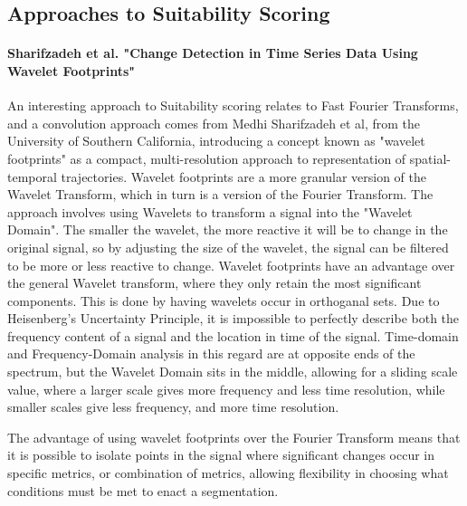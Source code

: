 \documentclass[12pt,a4paper]{report}
\begin{document}
\subsection{Approaches to Suitability Scoring}

\paragraph{Sharifzadeh et al. "Change Detection in Time Series Data Using Wavelet Footprints"}
An interesting approach to Suitability scoring relates to Fast Fourier Transforms, and a convolution approach comes from Medhi Sharifzadeh et al, from the University of Southern California, introducing a concept known as
"wavelet footprints" as a compact, multi-resolution approach to representation of spatial-temporal trajectories. Wavelet footprints are a  more granular version of the Wavelet Transform, which in turn is a version of the Fourier Transform. The approach involves using Wavelets to transform a signal into the "Wavelet Domain".
The smaller the wavelet, the more reactive it will be to change in the original signal, so by adjusting the size of the wavelet, the signal can be filtered to be more or less reactive to change.
Wavelet footprints have an advantage over the general Wavelet transform, where they only retain the most significant components. This is done by having wavelets occur in orthoganal sets.
Due to Heisenberg's Uncertainty Principle, it is impossible to perfectly describe both the frequency content of a signal and the location in time of the signal. Time-domain and Frequency-Domain analysis in this regard are
at opposite ends of the spectrum, but the Wavelet Domain sits in the middle, allowing for a sliding scale value, where a larger scale gives more frequency and less time resolution, while smaller scales give less frequency, and more time resolution.

The advantage of using wavelet footprints over the Fourier Transform means that it is possible to isolate points in the signal where significant changes occur in specific metrics, or combination of metrics, allowing flexibility in choosing
what conditions must be met to enact a segmentation.
\end{document}
